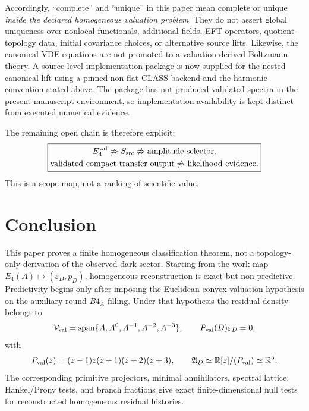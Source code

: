 \documentclass[11pt,a4paper]{article}
\def\Bfour{B4}%
\def\Dil{D}%
\numberwithin{equation}{section}
\theoremstyle{definition}
\theoremstyle{plain}
\theoremstyle{remark}
\newcommand{\Bfour}{B^4}
\newcommand{\Dil}{\mathscr{D}}
\newcommand{\Efour}{E_4}
\newcommand{\epsD}{\varepsilon_D}
\newcommand{\pD}{p_D}
\begin{document}
Accordingly, ``complete'' and ``unique'' in this paper mean complete or unique
\emph{inside the declared homogeneous valuation problem}.  They do not assert
global uniqueness over nonlocal functionals, additional fields, EFT operators,
quotient-topology data, initial covariance choices, or alternative source lifts.
Likewise, the canonical VDE equations are not promoted to a valuation-derived
Boltzmann theory.  A source-level implementation package is now supplied for
the nested canonical lift using a pinned non-flat CLASS backend and the harmonic
convention stated above.  The package has not produced validated spectra in the
present manuscript environment, so implementation availability is kept distinct
from executed numerical evidence.

The remaining open chain is therefore explicit:
\begin{equation}
\boxed{
\begin{gathered}
\Efour^{\rm val}\not\Rightarrow S_{\rm src}
\not\Rightarrow \text{amplitude selector},\\
\text{validated compact transfer output}
\not\Rightarrow \text{likelihood evidence}.
\end{gathered}}
\end{equation}
This is a scope map, not a ranking of scientific value.

\section{Conclusion}
\label{sec:conclusion}

This paper proves a finite homogeneous classification theorem, not a topology-only derivation of the observed dark sector.  Starting from the work map
\(\Efour(A)\mapsto(\epsD,\pD)\), homogeneous reconstruction is exact but non-predictive.  Predictivity begins only after imposing the Euclidean convex valuation hypothesis on the auxiliary round \(\Bfour_A\) filling.  Under that hypothesis the residual density belongs to
\begin{equation}
\mathcal V_{\rm val}=\operatorname{span}\{A,A^0,A^{-1},A^{-2},A^{-3}\},
\qquad
P_{\rm val}(\Dil)\epsD=0,
\end{equation}
with
\begin{equation}
P_{\rm val}(z)=(z-1)z(z+1)(z+2)(z+3),
\qquad
\mathfrak A_{\Dil}\simeq\mathbb R[z]/(P_{\rm val})\simeq\mathbb R^5.
\end{equation}
The corresponding primitive projectors, minimal annihilators, spectral lattice,
Hankel/Prony tests, and branch fractions give exact finite-dimensional null
tests for reconstructed homogeneous residual histories.
\end{document}
